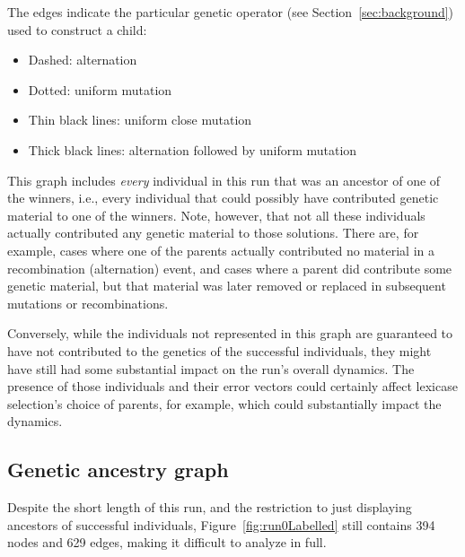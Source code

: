\documentclass[graybox]{svmult}
\begin{document}
The edges indicate the particular genetic operator (see Section~\ref{sec:background}) used to construct a child:
\begin{itemize}
	\item Dashed: alternation
	\item Dotted: uniform mutation
	\item Thin black lines: uniform close mutation
	\item Thick black lines: alternation followed by uniform mutation
\end{itemize}

This graph includes \emph{every} individual in this run that was an 
ancestor of one of the winners, i.e., every individual that could possibly have 
contributed genetic material to one of the winners. Note, however, that not
all these individuals actually contributed any genetic material to those
solutions. There are, for example, cases where one of the parents actually
contributed no material in a recombination (alternation) event, and cases where
a parent did contribute some genetic material, but that material was later
removed or replaced in subsequent mutations or recombinations. 

Conversely, while the individuals not represented in this graph are
guaranteed to have not contributed to the genetics of the successful
individuals, they might have still had some substantial impact on the
run's overall dynamics. The presence of those individuals and their
error vectors could certainly affect lexicase selection's choice of parents,
for example, which could substantially impact the dynamics.

\subsection{Genetic ancestry graph}

Despite the short length of this run, and the restriction to just displaying
ancestors of successful individuals, Figure~\ref{fig:run0Labelled} still
contains 394 nodes and 629 edges, making it difficult to analyze in full.
\end{document}
